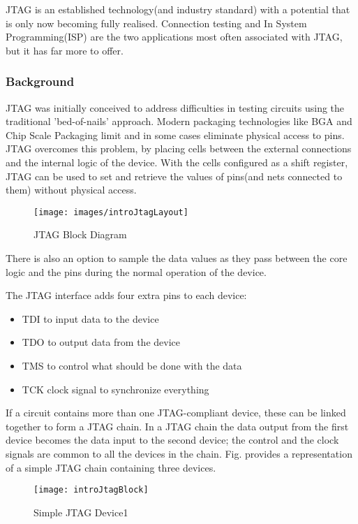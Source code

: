 \documentclass[a4paper,11pt]{article}
\begin{document}
JTAG is an established technology(and industry standard) with a potential that is only now becoming fully realised. Connection testing and In System Programming(ISP) are the two applications most often associated with JTAG, but it has far more to offer.
\subsubsection{Background}
JTAG was initially conceived to address difficulties in testing circuits using the traditional 'bed-of-nails' approach. Modern packaging technologies like BGA and Chip Scale Packaging limit and in some cases eliminate physical access to pins.
JTAG overcomes this problem, by placing cells between the external connections and the internal logic of the device. With the cells configured as a shift register, JTAG can be used to set and retrieve the values of pins(and nets connected to them) without physical access.

\begin{figure}[ht]
\centering
\texttt{[image: images/introJtagLayout]}
\caption{JTAG Block Diagram}
\end{figure}

There is also an option to sample the data values as they pass between the core logic and the pins during the normal operation of the device.

The JTAG interface adds four extra pins to each device:
\begin{itemize}[noitemsep]
\item TDI to input data to the device
\item TDO to output data from the device
\item TMS to control what should be done with the data
\item TCK clock signal to synchronize everything
\end{itemize}

If a circuit contains more than one JTAG-compliant device, these can be linked together to form a JTAG chain. In a JTAG chain the data output from the first device becomes the data input to the second device; the control and the clock signals are common to all the devices in the chain. Fig. provides a representation of a simple JTAG chain containing three devices.

\begin{figure}[ht]
\centering
\texttt{[image: introJtagBlock]}
\caption{Simple JTAG Device1}
\end{figure}
\end{document}
